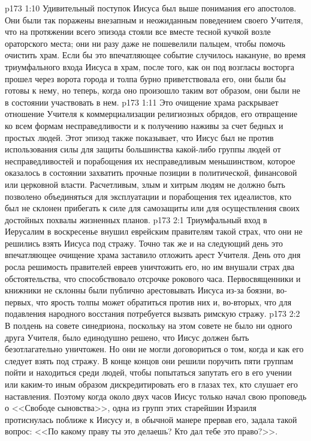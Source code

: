\vs p173 1:10 Удивительный поступок Иисуса был выше понимания его апостолов. Они были так поражены внезапным и неожиданным поведением своего Учителя, что на протяжении всего эпизода стояли все вместе тесной кучкой возле ораторского места; они ни разу даже не пошевелили пальцем, чтобы помочь очистить храм. Если бы это впечатляющее событие случилось накануне, во время триумфального входа Иисуса в храм, после того, как он под возгласы восторга прошел через ворота города и толпа бурно приветствовала его, они были бы готовы к нему, но теперь, когда оно произошло таким вот образом, они были не в состоянии участвовать в нем.
\vs p173 1:11 Это очищение храма раскрывает отношение Учителя к коммерциализации религиозных обрядов, его отвращение ко всем формам несправедливости и к получению наживы за счет бедных и простых людей. Этот эпизод также показывает, что Иисус был не против использования силы для защиты большинства какой\hyp{}либо группы людей от несправедливостей и порабощения их несправедливым меньшинством, которое оказалось в состоянии захватить прочные позиции в политической, финансовой или церковной власти. Расчетливым, злым и хитрым людям не должно быть позволено объединяться для эксплуатации и порабощения тех идеалистов, кто был не склонен прибегать к силе для самозащиты или для осуществления своих достойных похвалы жизненных планов.
\vs p173 2:1 Триумфальный вход в Иерусалим в воскресенье внушил еврейским правителям такой страх, что они не решились взять Иисуса под стражу. Точно так же и на следующий день это впечатляющее очищение храма заставило отложить арест Учителя. День ото дня росла решимость правителей евреев уничтожить его, но им внушали страх два обстоятельства, что способствовало отсрочке рокового часа. Первосвященники и книжники не склонны были публично арестовывать Иисуса из\hyp{}за боязни, во\hyp{}первых, что ярость толпы может обратиться против них и, во\hyp{}вторых, что для подавления народного восстания потребуется вызвать римскую стражу.
\vs p173 2:2 В полдень на совете синедриона, поскольку на этом совете не было ни одного друга Учителя, было единодушно решено, что Иисус должен быть безотлагательно уничтожен. Но они не могли договориться о том, когда и как его следует взять под стражу. В конце концов они решили поручить пяти группам пойти и находиться среди людей, чтобы попытаться запутать его в его учении или каким\hyp{}то иным образом дискредитировать его в глазах тех, кто слушает его наставления. Поэтому когда около двух часов Иисус только начал свою проповедь о <<Свободе сыновства>>, одна из групп этих старейшин Израиля протиснулась поближе к Иисусу и, в обычной манере прервав его, задала такой вопрос: <<По какому праву ты это делаешь? Кто дал тебе это право?>>.
